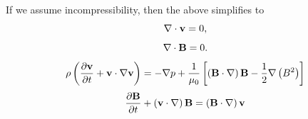 \documentclass[a4paper,11pt]{report}
\begin{document}
If we assume incompressibility, then the above simplifies to
\begin{equation}
    \nabla \cdot \mathbf{v} = 0,
\end{equation}
\begin{equation}
    \nabla \cdot \mathbf{B} = 0.
    \end{equation}
\begin{equation}
    \rho \left (\frac{\partial \mathbf{v}}{\partial t} + \mathbf{v} \cdot \nabla \mathbf{v} \right ) = - \nabla p  + \frac{1}{\mu_0} \left [ \left ( \mathbf{B} \cdot \nabla \right ) \mathbf{B} - \frac{1}{2} \nabla \left ( B^2 \right ) \right ]
\end{equation}
\begin{equation}
    \frac{\partial \mathbf{B}}{\partial t} + \left ( \mathbf{v} \cdot \nabla \right ) \mathbf{B} = \left ( \mathbf{B} \cdot \nabla \right ) \mathbf{v}
\end{equation}


\end{document}
